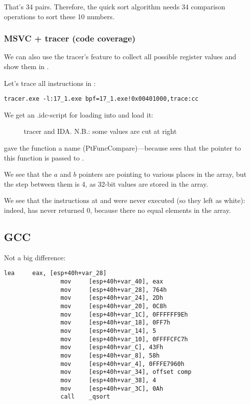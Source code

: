 That's 34 pairs.
Therefore, the quick sort algorithm needs 34 comparison operations to sort these 10 numbers.

\clearpage
\subsubsection{MSVC + tracer (code coverage)}

We can also use the tracer's feature to collect all possible register values and show them in \IDA.

Let's trace all instructions in \comp:

\begin{lstlisting}
tracer.exe -l:17_1.exe bpf=17_1.exe!0x00401000,trace:cc
\end{lstlisting}

We get an .idc-script for loading into \IDA and load it:

\begin{figure}[H]
\centering
{}
\caption{tracer and IDA. N.B.: 
some values are cut at right}
\label{fig:qsort_tracer_cc}
\end{figure}

\IDA gave the function a name (PtFuncCompare)---because \IDA sees that the pointer to this function is passed to \qsort.

We see that the $a$ and $b$ pointers are pointing to various places in the array, but the step between
them is 4, as 32-bit values are stored in the array.

We see that the instructions at  and  were never executed (so they left as white): 
indeed, \comp has never returned 0, because there no equal elements in the array.

\subsection{GCC}

Not a big difference:

\begin{lstlisting}[caption=GCC,style=customasmx86]
                lea     eax, [esp+40h+var_28]
                mov     [esp+40h+var_40], eax
                mov     [esp+40h+var_28], 764h
                mov     [esp+40h+var_24], 2Dh
                mov     [esp+40h+var_20], 0C8h
                mov     [esp+40h+var_1C], 0FFFFFF9Eh
                mov     [esp+40h+var_18], 0FF7h
                mov     [esp+40h+var_14], 5
                mov     [esp+40h+var_10], 0FFFFCFC7h
                mov     [esp+40h+var_C], 43Fh
                mov     [esp+40h+var_8], 58h
                mov     [esp+40h+var_4], 0FFFE7960h
                mov     [esp+40h+var_34], offset comp
                mov     [esp+40h+var_38], 4
                mov     [esp+40h+var_3C], 0Ah
                call    _qsort
\end{lstlisting}


